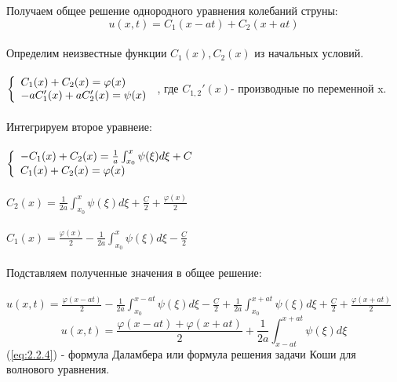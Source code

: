 \documentclass[../main.tex]{subfiles}
\begin{document}
Получаем общее решение однородного уравнения колебаний струны:\\
\[u(x,t)=C_1(x-at)+C_2(x+at)\]\\
Определим неизвестные функции $C_1(x), C_2(x)$ из начальных условий.\\\\
$
	\begin{left}
		\{
		\begin{array}{lcl}
			C_{1}(x)+C_2(x)=\varphi(x) \\
			-aC_1'(x)+aC_2'(x)=\psi(x) \\
		\end{array}
		\right.
	\end{left}
$
, где $C_{1,2}'(x)$- производные по переменной x.\\
\\Интегрируем второе уравнеие:\\\\
$
	\begin{left}
		\{
		\begin{array}{lcl}
			-C_1(x)+C_2(x)=\frac{1}{a}\int_{x_0}^x\psi(\xi)d\xi+C \\
			C_1(x)+C_2(x)=\varphi(x)                              \\
		\end{array}
		\right.
	\end{left}
$
\\\\
$C_2(x)=\frac{1}{2a}\int_{x_0}^x\psi(\xi)d\xi+\frac{C}{2}+\frac{\varphi(x)}{2}$\\\\
$C_1(x)=\frac{\varphi(x)}{2}-\frac{1}{2a}\int_{x_0}^x\psi(\xi)d\xi-\frac{C}{2}$\\\\
Подставляем полученные значения в общее решение:\\\\
$u(x,t)=\frac{\varphi(x-at)}{2}-\frac{1}{2a}\int_{x_0}^{x-at}\psi(\xi)d\xi-\frac{C}{2}+\frac{1}{2a}\int_{x_0}^{x+at}\psi(\xi)d\xi+\frac{C}{2}+\frac{\varphi(x+at)}{2}$
\begin{equation}\label{eq:2.2.4}
	u(x,t)=\frac{\varphi(x-at)+\varphi(x+at)}{2}+\frac{1}{2a}\int_{x-at}^{x+at}\psi(\xi)d\xi
\end{equation}
(\ref{eq:2.2.4}) - формула Даламбера или формула решения задачи Коши для волнового уравнения.
\end{document}
